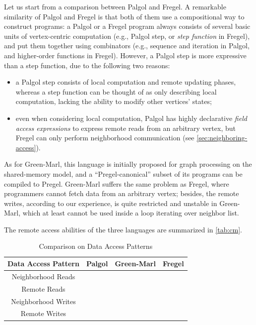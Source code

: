 \documentclass{sokendai_thesis} %
\newcommand{\cmark}{\ding{51}}%
\newcommand{\xmark}{\ding{55}}%
\begin{document}
Let us start from a comparison between Palgol and Fregel.
A remarkable similarity of Palgol and Fregel is that both of them use a compositional way to construct programs:
a Palgol or a Fregel program always consists of several basic units of vertex-centric computation (e.g., Palgol step, or \emph{step function} in Fregel), and put them together using combinators (e.g., sequence and iteration in Palgol, and higher-order functions in Fregel).
However, a Palgol step is more expressive than a step function, due to the following two reasons:
\begin{itemize}\setlength\itemsep{0em}
 \item a Palgol step consists of local computation and remote updating phases, whereas a step function can be thought of as only describing local computation, lacking the ability to modify other vertices' states;
 \item even when considering local computation, Palgol has highly declarative \textit{field access expressions} to express remote reads from an arbitrary vertex, but Fregel can only perform neighborhood communication (see \autoref{sec:neighboring-access}).
\end{itemize}

As for Green-Marl, this language is initially proposed for graph processing on the shared-memory model, and a ``Pregel-canonical'' subset of its programs can be compiled to Pregel.
Green-Marl suffers the same problem as Fregel, where programmers cannot fetch data from an arbitrary vertex;
besides, the remote writes, according to our experience, is quite restricted and unstable in Green-Marl, which at least cannot be used inside a loop iterating over neighbor list.

The remote access abilities of the three languages are summarized in \autoref{tab:cm}.
\begin{table}[thp]
 \vspace{-2ex}
 \centering
 \caption{Comparison on Data Access Patterns}
 \label{tab:cm}
 \begin{tabular}{c|c|c|c}
  \hline
  \textbf{Data Access Pattern} & Palgol & Green-Marl & Fregel \\
  \hline\hline
  Neighborhood Reads & \cmark & \cmark & \cmark \\
  \hline
  Remote Reads & \cmark & \xmark & \xmark \\
  \hline
  Neighborhood Writes & \cmark & \xmark & \xmark \\
  \hline
  Remote Writes & \cmark & \cmark & \xmark \\
  \hline
 \end{tabular}
\vspace{-2ex}\end{table}
\end{document}
